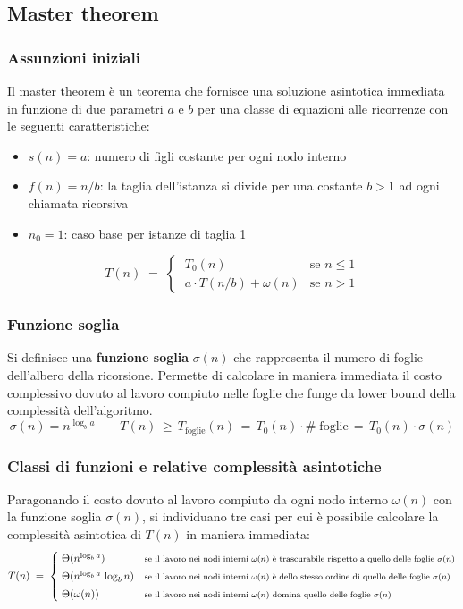 \subsection{Master theorem}
\subsubsection*{Assunzioni iniziali}
Il master theorem è un teorema che fornisce una soluzione asintotica immediata in funzione di due parametri \(a\) e \(b\)
per una classe di equazioni alle ricorrenze con le seguenti caratteristiche:
\begin{itemize}
	\item \(s(n) = a\): numero di figli costante per ogni nodo interno
	\item \(f(n) = n/b\): la taglia dell'istanza si divide per una costante \(b > 1\) ad ogni chiamata ricorsiva
	\item \(n_0 = 1\): caso base per istanze di taglia 1
\end{itemize}

\[T(n) \; = \; \begin{cases}
	\; T_0(n) & \text{se } n \leq 1 \\[3pt]
	\; a \cdot T(n/b) + \omega(n) & \text{se } n > 1
\end{cases}\]

\subsubsection*{Funzione soglia}
Si definisce una \textbf{funzione soglia} \(\sigma(n)\) che rappresenta il numero di foglie dell'albero della ricorsione.
Permette di calcolare in maniera immediata il costo complessivo dovuto al lavoro compiuto nelle foglie che funge da lower
bound della complessità dell'algoritmo.
\[\sigma(n) = n^{\log_b a} \qquad T(n) \, \geq \, T_{\text{foglie}}(n) \, = \, T_0(n) \cdot \# \; \text{foglie} \, = \, T_0(n) \cdot \sigma(n)\]

\subsubsection*{Classi di funzioni e relative complessità asintotiche}
Paragonando il costo dovuto al lavoro compiuto da ogni nodo interno \(\omega(n)\) con la funzione soglia \(\sigma(n)\), si
individuano tre casi per cui è possibile calcolare la complessità asintotica di \(T(n)\) in maniera immediata:
\[T(n) \; = \; \begin{cases}
	\; \Theta (n^{\log_b a}) & \text{\footnotesize se il lavoro nei nodi interni \(\omega(n)\) è trascurabile rispetto a quello delle foglie \(\sigma(n)\)}  \\[3pt]
	\; \Theta (n^{\log_b a} \, \log_b n) & \text{\footnotesize se il lavoro nei nodi interni \(\omega(n)\) è dello stesso ordine di quello delle foglie \(\sigma(n)\)}  \\[3pt]
	\; \Theta (\omega(n)) & \text{\footnotesize se il lavoro nei nodi interni \(\omega(n)\) domina quello delle foglie \(\sigma(n)\)}
\end{cases}\]

